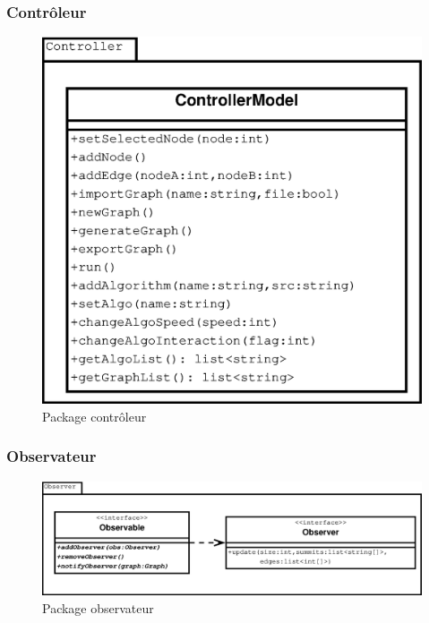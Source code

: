 \documentclass[11pt,a4paper]{article}
\begin{document}
			\subsubsection*{Contrôleur}
				\begin{figure}[htbp]
					\begin{center}
						\includegraphics[scale=.4]{class_controller.eps}
					\end{center}
					\caption{Package contrôleur}
					\label{img_class_controler}
				\end{figure}
				\newpage
			\subsubsection*{Observateur}
				\begin{figure}[htbp]
					\begin{center}
						\includegraphics[width=0.75\linewidth]{class_observer.eps}
					\end{center}
					\caption{Package observateur}
					\label{img_class_observer}
				\end{figure}
\end{document}
